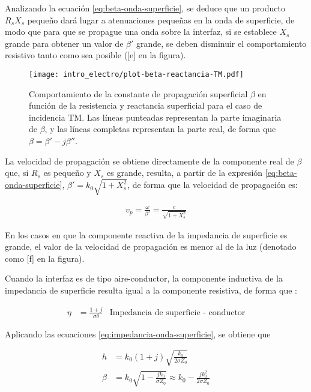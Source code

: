 Analizando la ecuación \ref{eq:beta-onda-superficie}, se deduce que un producto $R_s X_s$ pequeño dará lugar a atenuaciones pequeñas en la onda de superficie, de modo que para que se propague una onda sobre la interfaz, si se establece $X_s$ grande para obtener un valor de $\beta'$ grande, se deben disminuir el comportamiento resistivo tanto como sea posible ([e] en la figura).

\begin{figure}[htp]
	\centering
	\texttt{[image: intro\_electro/plot-beta-reactancia-TM.pdf]}
	\caption{Comportamiento de la constante de propagación superficial $\beta$ en función de la resistencia y reactancia superficial para el caso de incidencia TM. Las líneas punteadas representan la parte imaginaria de $\beta$, y las líneas completas representan la parte real, de forma que $\beta = \beta' - j\beta''$.}
	\label{fig:beta-reactancia-TM}
\end{figure}

La velocidad de propagación se obtiene directamente de la componente real de $\beta$ que, si $R_s$ es pequeño y $X_s$ es grande, resulta, a partir de la expresión \ref{eq:beta-onda-superficie}, $\beta' = k_0 \sqrt{1+X_s^2}$, de forma que la velocidad de propagación es:

\begin{align}
	v_p = \frac{\omega}{\beta'} = \frac{c}{\sqrt{1+X_s^2}}
\end{align}

En los casos en que la componente reactiva de la impedancia de superficie es grande, el valor de la velocidad de propagación es menor al de la luz (denotado como [f] en la figura).


Cuando la interfaz es de tipo aire-conductor, la componente inductiva de la impedancia de superficie resulta igual a la componente resistiva, de forma que \cite{Fernandez:Electromag}:

\begin{align}
	\eta &= \frac{1+j}{\sigma \delta} &\text{Impedancia de superficie - conductor}
\end{align}
 
Aplicando las ecuaciones \ref{eq:impedancia-onda-superficie}, se obtiene que

\begin{align}
	h &= k_0 (1+j) \sqrt{\frac{k_0}{2 \sigma Z_0}} \\
	\beta &= k_0 \sqrt{1-\frac{j k_0}{\sigma Z_0}} \approx k_0 - \frac{j k_0^2}{2 \sigma Z_0}
\end{align}

